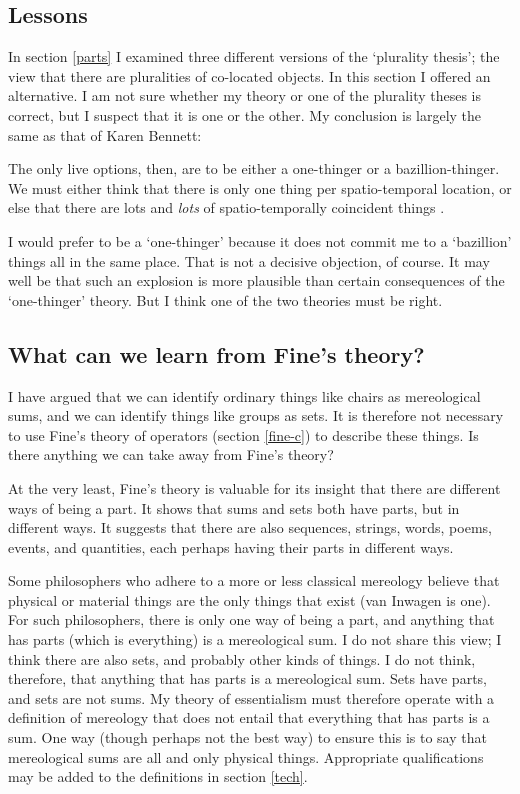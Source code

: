 \documentclass[11pt]{article}
\newenvironment{squote}{%
\begin{spacing}{1}
\begin{list}{}{%
\setlength{\labelwidth}{0pt}%
\rightmargin\leftmargin%
}
\item\relax
}{%
\end{list}%
\end{spacing}
}
\begin{document}
\begin{spacing}{1.5}
\section{Lessons}
\label{lessons-e}
In section \ref{parts} I examined three different versions of the
`plurality thesis'; the view that there are pluralities of co-located
objects.  In this section I offered an alternative.  I am not sure
whether my theory or one of the plurality theses is correct, but I
suspect that it is one or the other.  My conclusion is largely the
same as that of Karen Bennett:

\begin{squote}
The only live options, then, are to be either a one-thinger or a
bazillion-thinger.  We must either think that there is only one thing per
spatio-temporal location, or else that there are lots and \emph{lots} of
spatio-temporally coincident things \citeyearpar[358]{bennett2004}.
\end{squote}

I would prefer to be a `one-thinger' because it does not commit me to
a `bazillion' things all in the same place.  That is not a decisive
objection, of course.  It may well be that such an explosion is more
plausible than certain consequences of the `one-thinger' theory.  But
I think one of the two theories must be right.

\subsection{What can we learn from Fine's theory?}
\label{need-fine}
I have argued that we can identify ordinary things like chairs as
mereological sums, and we can identify things like groups as sets.  It
is therefore not necessary to use Fine's theory of operators (section
\ref{fine-c}) to describe these things.  Is there anything we can take
away from Fine's theory?

At the very least, Fine's theory is valuable for its insight that
there are different ways of being a part.  It shows that sums and sets
both have parts, but in different ways.  It suggests that there are
also sequences, strings, words, poems, events, and quantities, each
perhaps having their parts in different ways.

Some philosophers who adhere to a more or less classical mereology
believe that physical or material things are the only things that
exist (van Inwagen is one).  For such philosophers, there is only one
way of being a part, and anything that has parts (which is everything)
is a mereological sum.  I do not share this view; I think there are
also sets, and probably other kinds of things.  I do not think,
therefore, that anything that has parts is a mereological sum.  Sets
have parts, and sets are not sums.  My theory of essentialism must
therefore operate with a definition of mereology that does not entail
that everything that has parts is a sum.  One way (though perhaps not
the best way) to ensure this is to say that mereological sums are all
and only physical things.  Appropriate qualifications may be added to
the definitions in section \ref{tech}.


\end{spacing}
\end{document}
